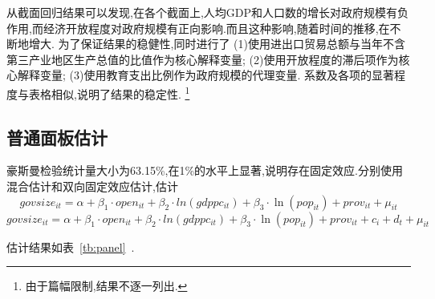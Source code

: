 \documentclass[10pt]{article}
\begin{document}
    \restoregeometry
        从截面回归结果可以发现,在各个截面上,人均GDP和人口数的增长对政府规模有负作用,而经济开放程度对政府规模有正向影响.而且这种影响,随着时间的推移,在不断地增大.
        为了保证结果的稳健性,同时进行了
        (1)使用进出口贸易总额与当年不含第三产业地区生产总值的比值作为核心解释变量;
        (2)使用开放程度的滞后项作为核心解释变量;
        (3)使用教育支出比例作为政府规模的代理变量.
        系数及各项的显著程度与表格相似,说明了结果的稳定性.
    \footnote{由于篇幅限制,结果不逐一列出.}

\subsection{普通面板估计}
    豪斯曼检验统计量大小为63.15\%,在1\%的水平上显著,说明存在固定效应.分别使用混合估计和双向固定效应估计,估计
    \begin{equation}
        govsize_{it} = \alpha + \beta_{1} \cdot open_{it} + \beta_{2} \cdot ln(gdppc_{it}) + \beta_{3} \cdot \ln(pop_{it}) + prov_{it} + \mu_{it}
    \end{equation}
    \begin{equation}    
        govsize_{it} = \alpha + \beta_{1} \cdot open_{it} + \beta_{2} \cdot ln(gdppc_{it}) + \beta_{3} \cdot \ln(pop_{it}) + prov_{it} +c_{i} +d_{t} + \mu_{it}
    \end{equation}
    
    估计结果如表~\ref{tb:panel}~.
\end{document}
